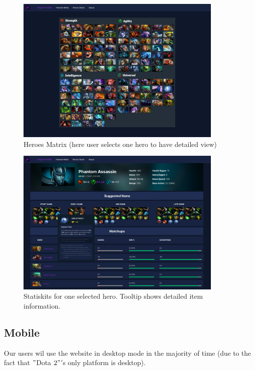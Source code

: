     \begin{figure}[ht]
        \centering
        \includegraphics[width=0.9\textwidth]{images/HeroMatrix}
        \caption{Heroes Matrix (here user selects one hero to have detailed view)}
    \end{figure}

    \begin{figure}[ht]
        \centering
        \includegraphics[width=0.9\textwidth]{images/SelectedHero}
        \caption{Statiskits for one selected hero. Tooltip shows detailed item information.}
    \end{figure}

    \clearpage

    \subsection{Mobile}

    Our users wil use the website in desktop mode in the majority of time (due to the fact that \("\)Dota \(2"\)\('\)s only platform is desktop).

